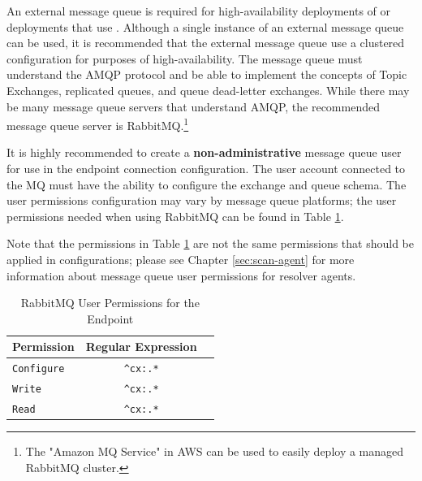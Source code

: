 An external message queue is required for high-availability deployments of \cxoneflow or deployments that use
.  Although a single instance of an external message queue can be used, it is
recommended that the external message queue use a clustered configuration for purposes of high-availability.  The message queue
must understand the AMQP protocol and be able to implement the concepts of Topic Exchanges, replicated queues, and queue
dead-letter exchanges.  While there may be many message queue servers that understand AMQP, the recommended message queue
server is RabbitMQ.\footnote{The "Amazon MQ Service" in AWS can be used to easily deploy a managed RabbitMQ cluster.}

It is highly recommended to create a \textbf{non-administrative} message queue user for use in the \cxoneflow endpoint
connection configuration.  The user account connected to the MQ must have the ability to configure the
exchange and queue schema.  The user permissions configuration may vary by message queue platforms; the user permissions
needed when using RabbitMQ can be found in Table \ref{tab:server-mq-user-perms}.  

Note that the permissions in Table \ref{tab:server-mq-user-perms} are not the same permissions
that should be applied in  configurations; please see Chapter \ref{sec:scan-agent} for more
information about message queue user permissions for resolver agents.

\begin{table}[ht]
    \caption{RabbitMQ User Permissions for the \cxoneflow Endpoint}  
    \label{tab:server-mq-user-perms}      
    \begin{tabularx}{\textwidth}{lcl}
        \toprule
        \textbf{Permission} & \textbf{Regular Expression} \\
        \midrule
        \texttt{Configure} & \texttt{\^{}cx:.*} \\
        \midrule
        \texttt{Write} & \texttt{\^{}cx:.*} \\
        \midrule
        \texttt{Read} & \texttt{\^{}cx:.*} \\
        \midrule
        \bottomrule
    \end{tabularx}
\end{table}



